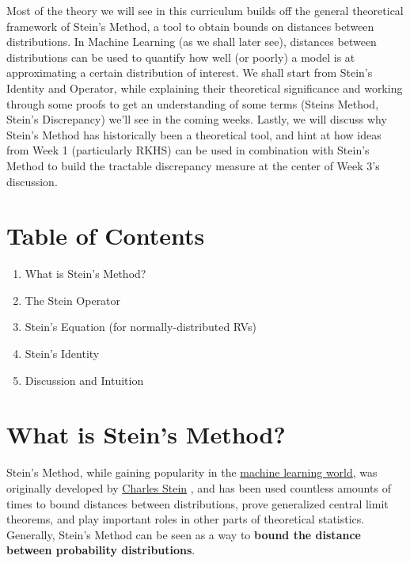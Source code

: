 \documentclass[12pt]{article}
\begin{document}
	\MakeScribeTop


Most of the theory we will see in this curriculum builds off the general theoretical framework of Stein's Method, a tool to obtain bounds on distances between distributions. In Machine Learning (as we shall later see), distances between distributions can be used to quantify how well (or poorly) a model is at approximating a certain distribution of interest. We shall start from Stein's Identity and Operator, while explaining their theoretical significance and working through some proofs to get an understanding of some terms (Steins Method, Stein's Discrepancy) we'll see in the coming weeks. Lastly, we will discuss why Stein's Method has historically been a theoretical tool, and hint at how ideas from Week 1 (particularly RKHS) can be used in combination with Stein's Method to build the tractable discrepancy measure at the center of Week 3's discussion.

\section{Table of Contents}

\begin{enumerate}
    \item What is Stein's Method?
    \item The Stein Operator
    \item Stein's Equation (for normally-distributed RVs)
    \item Stein's Identity
    \item Discussion and Intuition
\end{enumerate}

\section{What is Stein's Method?}

Stein's Method, while gaining popularity in the \href{https://steinworkshop.github.io/}{machine learning world}, was originally developed by \href{https://en.wikipedia.org/wiki/Charles_M._Stein}{Charles Stein} \cite{stein1972}, and has been used countless amounts of times to bound distances between distributions, prove generalized central limit theorems, and play important roles in other parts of theoretical statistics. Generally, Stein's Method can be seen as a way to \textbf{bound the distance between probability distributions}.
\end{document}
